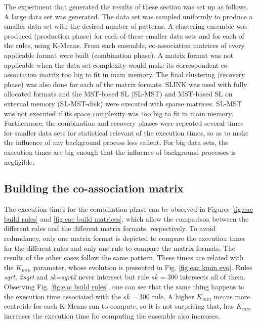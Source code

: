 The experiment that generated the results of these section was set up as follows.
A large data set was generated.
The data set was sampled uniformly to produce a smaller data set with the desired number of patterns.
A clustering ensemble was produced (production phase) for each of these smaller data sets and for each of the rules, using K-Means.
From each ensemble, co-association matrices of every applicable format were built (combination phase).
A matrix format was not applicable when the data set complexity would make its correspondent co-association matrix too big to fit in main memory.
The final clustering (recovery phase) was also done for each of the matrix formats.
SLINK was used with fully allocated formats and the MST-based SL (SL-MST) and MST-based SL on external memory (SL-MST-disk) were executed with sparse matrices.
SL-MST was not executed if its space complexity was too big to fit in main memory.
Furthermore, the combination and recovery phases were repeated several times for smaller data sets for statistical relevant of the execution times, so as to make the influence of any background process less salient.
For big data sets, the execution times are big enough that the influence of background processes is negligible.

\subsection{Building the co-association matrix}

The execution times for the combination phase can be observed in Figures \ref{fig:eac build rules} and \ref{fig:eac build matrices}, which allow the comparison between the different rules and the different matrix formats, respectively.
To avoid redundancy, only one matrix format is depicted to compare the execution times for the different rules and only one rule to compare the matrix formats.
The results of the other cases follow the same pattern.
These times are related with the $K_{min}$ parameter, whose evolution is presented in Fig. \ref{fig:eac kmin evo}.
Rules \emph{sqrt}, \emph{2sqrt} and \emph{sk=sqrt2} never intersect but rule $sk=300$ intersects all of them.
Observing Fig. \ref{fig:eac build rules}, one can see that the same thing happens to the execution time associated with the $sk=300$ rule.
A higher $K_{min}$ means more centroids for each K-Means run to compute, so it is not surprising that, has $K_{min}$ increases the execution time for computing the ensemble also increases.

